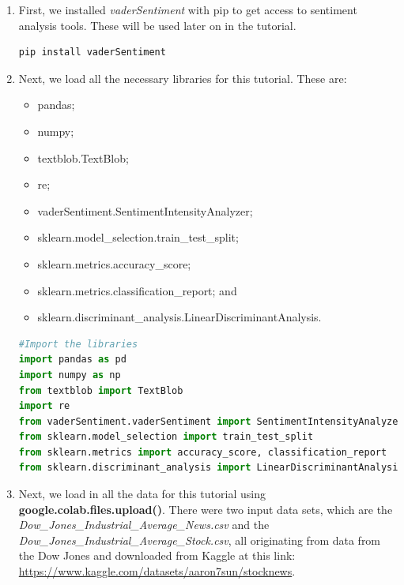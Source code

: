 \documentclass[10pt,twocolumn]{article}
\begin{document}
\begin{enumerate}
    \item First, we installed \textit{vaderSentiment} with pip to get access to sentiment analysis tools. These will be used later on in the tutorial.
    
\lstset{style=python}

\begin{lstlisting}[language=Python, caption=Install vaderSentiment]
pip install vaderSentiment
\end{lstlisting}

    \item Next, we load all the necessary libraries for this tutorial. These are:
    \begin{itemize}
        \item pandas;
        \item numpy;
        \item textblob.TextBlob;
        \item re;
        \item vaderSentiment.SentimentIntensityAnalyzer;
        \item sklearn.model\_selection.train\_test\_split;
        \item sklearn.metrics.accuracy\_score;
        \item sklearn.metrics.classification\_report; and
        \item sklearn.discriminant\_analysis.LinearDiscriminantAnalysis.
    \end{itemize}

\begin{lstlisting}[language=Python, caption=Load Libraries]
#Import the libraries
import pandas as pd
import numpy as np
from textblob import TextBlob
import re
from vaderSentiment.vaderSentiment import SentimentIntensityAnalyzer
from sklearn.model_selection import train_test_split
from sklearn.metrics import accuracy_score, classification_report
from sklearn.discriminant_analysis import LinearDiscriminantAnalysis
\end{lstlisting}

    \item Next, we load in all the data for this tutorial using \textbf{google.colab.files.upload()}. There were two input data sets, which are the \textit{Dow\_Jones\_Industrial\_Average\_News.csv} and the \textit{Dow\_Jones\_Industrial\_Average\_Stock.csv}, all originating from data from the Dow Jones and downloaded from Kaggle at this link: \url{https://www.kaggle.com/datasets/aaron7sun/stocknews}.


\end{enumerate}
\end{document}
